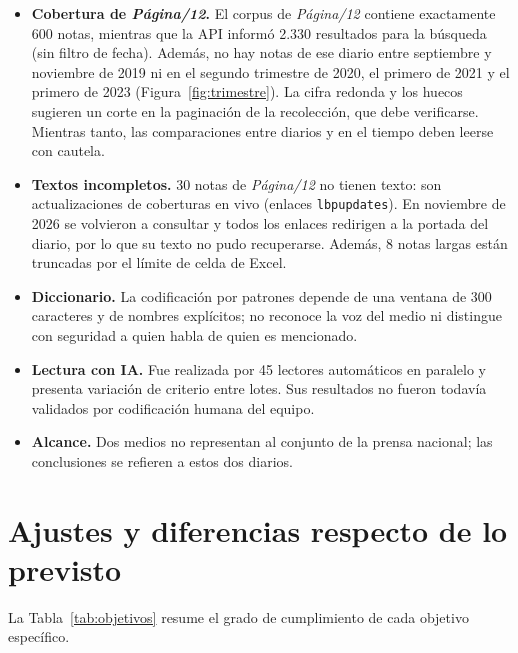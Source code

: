 \documentclass[11pt,a4paper]{article}
\newcommand{\pdoce}{\textit{Página/12}}
\begin{document}
\begin{itemize}
  \item \textbf{Cobertura de \pdoce.} El corpus de \pdoce{} contiene exactamente 600 notas, mientras que la API informó 2.330 resultados para la búsqueda (sin filtro de fecha). Además, no hay notas de ese diario entre septiembre y noviembre de 2019 ni en el segundo trimestre de 2020, el primero de 2021 y el primero de 2023 (Figura~\ref{fig:trimestre}). La cifra redonda y los huecos sugieren un corte en la paginación de la recolección, que debe verificarse. Mientras tanto, las comparaciones entre diarios y en el tiempo deben leerse con cautela.
  \item \textbf{Textos incompletos.} 30 notas de \pdoce{} no tienen texto: son actualizaciones de coberturas en vivo (enlaces \texttt{lbpupdates}). En noviembre de 2026 se volvieron a consultar y todos los enlaces redirigen a la portada del diario, por lo que su texto no pudo recuperarse. Además, 8 notas largas están truncadas por el límite de celda de Excel.
  \item \textbf{Diccionario.} La codificación por patrones depende de una ventana de 300 caracteres y de nombres explícitos; no reconoce la voz del medio ni distingue con seguridad a quien habla de quien es mencionado.
  \item \textbf{Lectura con IA.} Fue realizada por 45 lectores automáticos en paralelo y presenta variación de criterio entre lotes. Sus resultados no fueron todavía validados por codificación humana del equipo.
  \item \textbf{Alcance.} Dos medios no representan al conjunto de la prensa nacional; las conclusiones se refieren a estos dos diarios.
\end{itemize}

\section{Ajustes y diferencias respecto de lo previsto}

La Tabla~\ref{tab:objetivos} resume el grado de cumplimiento de cada objetivo específico.
\end{document}
